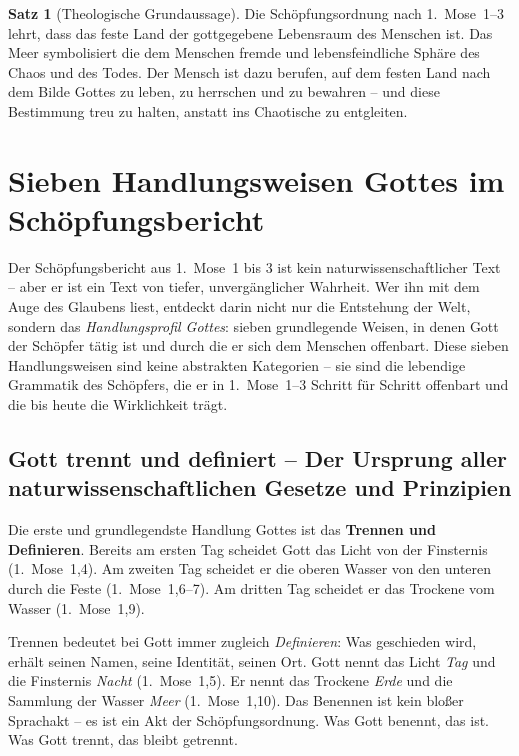 ﻿\documentclass[a4paper,12pt]{article}
\theoremstyle{definition}
\newtheorem{theorem}{Satz}[section]
\begin{document}
\begin{theorem}[Theologische Grundaussage]
    Die Schöpfungsordnung nach 1.~Mose~1--3 lehrt, dass das feste Land der
    gottgegebene Lebensraum des Menschen ist. Das Meer symbolisiert die dem Menschen
    fremde und lebensfeindliche Sphäre des Chaos und des Todes. Der Mensch ist
    dazu berufen, auf dem festen Land nach dem Bilde Gottes zu leben, zu herrschen
    und zu bewahren -- und diese Bestimmung treu zu halten, anstatt ins Chaotische
    zu entgleiten.
\end{theorem}

\section{Sieben Handlungsweisen Gottes im Schöpfungsbericht}

Der Schöpfungsbericht aus 1.~Mose~1 bis 3 ist kein naturwissenschaftlicher Text --
aber er ist ein Text von tiefer, unvergänglicher Wahrheit. Wer ihn mit dem Auge
des Glaubens liest, entdeckt darin nicht nur die Entstehung der Welt, sondern das
\textit{Handlungsprofil Gottes}: sieben grundlegende Weisen, in denen Gott der
Schöpfer tätig ist und durch die er sich dem Menschen offenbart. Diese sieben
Handlungsweisen sind keine abstrakten Kategorien -- sie sind die lebendige
Grammatik des Schöpfers, die er in 1.~Mose~1--3 Schritt für Schritt offenbart
und die bis heute die Wirklichkeit trägt.

\subsection{Gott trennt und definiert -- Der Ursprung aller naturwissenschaftlichen
	Gesetze und Prinzipien}

Die erste und grundlegendste Handlung Gottes ist das \textbf{Trennen und Definieren}.
Bereits am ersten Tag scheidet Gott das Licht von der Finsternis (1.~Mose~1,4).
Am zweiten Tag scheidet er die oberen Wasser von den unteren durch die Feste
(1.~Mose~1,6--7). Am dritten Tag scheidet er das Trockene vom Wasser (1.~Mose~1,9).

Trennen bedeutet bei Gott immer zugleich \textit{Definieren}: Was geschieden wird,
erhält seinen Namen, seine Identität, seinen Ort. Gott nennt das Licht \textit{Tag}
und die Finsternis \textit{Nacht} (1.~Mose~1,5). Er nennt das Trockene
\textit{Erde} und die Sammlung der Wasser \textit{Meer} (1.~Mose~1,10). Das
Benennen ist kein bloßer Sprachakt -- es ist ein Akt der Schöpfungsordnung. Was
Gott benennt, das ist. Was Gott trennt, das bleibt getrennt.
\end{document}
